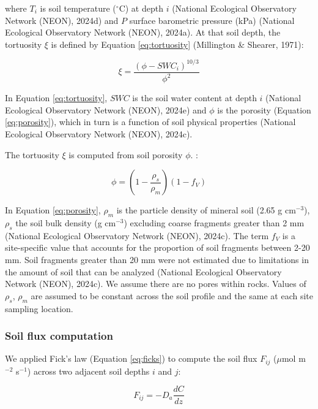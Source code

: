 \documentclass[
  letterpaper,
  DIV=11,
  numbers=noendperiod]{scrartcl}
\begin{document}
where \(T_{i}\) is soil temperature (\(^\circ\)C) at depth \(i\)
(National Ecological Observatory Network (NEON), 2024d) and \(P\)
surface barometric pressure (kPa) (National Ecological Observatory
Network (NEON), 2024a). At that soil depth, the tortuosity \(\xi\) is
defined by Equation \ref{eq:tortuosity} (Millington \& Shearer, 1971):

\begin{equation}
  \xi = \frac{(\phi - SWC_{i})^{10/3}}{\phi^{2}}
  \label{eq:tortuosity}
\end{equation}

In Equation \ref{eq:tortuosity}, \(SWC\) is the soil water content at
depth \(i\) (National Ecological Observatory Network (NEON), 2024e) and
\(\phi\) is the porosity (Equation \ref{eq:porosity}), which in turn is
a function of soil physical properties (National Ecological Observatory
Network (NEON), 2024c).

The tortuosity \(\xi\) is computed from soil porosity \(\phi\). :

\begin{equation}
  \phi = \left(1- \frac{\rho_{s}}{\rho_{m}} \right) \left(1-f_{V}\right)
  \label{eq:porosity}
\end{equation}

In Equation \ref{eq:porosity}, \(\rho_{m}\) is the particle density of
mineral soil (2.65 g cm\(^{-3}\)), \(\rho_{s}\) the soil bulk density (g
cm\(^{-3}\)) excluding coarse fragments greater than 2 mm (National
Ecological Observatory Network (NEON), 2024c). The term \(f_{V}\) is a
site-specific value that accounts for the proportion of soil fragments
between 2-20 mm. Soil fragments greater than 20 mm were not estimated
due to limitations in the amount of soil that can be analyzed (National
Ecological Observatory Network (NEON), 2024c). We assume there are no
pores within rocks. Values of \(\rho_{s}\), \(\rho_{m}\) are assumed to
be constant across the soil profile and the same at each site sampling
location.

\subsubsection{Soil flux computation}\label{sec-compute-soil-flux}

We applied Fick's law (Equation \ref{eq:ficks}) to compute the soil flux
\(F_{ij}\) (\(\mu\)mol m\(^{-2}\) s\(^{-1}\)) across two adjacent soil
depths \(i\) and \(j\):

\begin{equation}
  F_{ij} = -D_{a} \frac{dC}{dz}
  \label{eq:ficks}
\end{equation}
\end{document}

